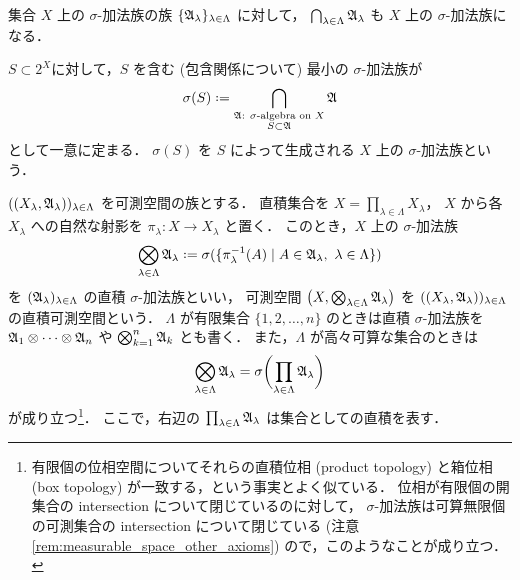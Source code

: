 \begin{example}
    集合 $X$ 上の $\sigma$-加法族の族 $\{\mathfrak{A}_\lambda\}_{\lambda\in\Lambda}$ に対して，
        $\bigcap_{\lambda\in\Lambda}\mathfrak{A}_\lambda$
    も $X$ 上の $\sigma$-加法族になる．

    $S\subset 2^X$に対して，$S$ を含む (包含関係について) 最小の $\sigma$-加法族が
    \begin{align*}
        \sigma(S)\defeq\bigcap_{\substack{\text{$\Afrak$: $\sigma$-algebra on $X$}\\S\subset\Afrak}}\Afrak
    \end{align*}
    として一意に定まる．
    $\sigma(S)$ を $S$ によって生成される $X$ 上の $\sigma$-加法族という．
\end{example}

\begin{example}\label{ex:product_sigma_algebra}
    $((X_\lambda,\mathfrak{A}_\lambda))_{\lambda\in\Lambda}$ を可測空間の族とする．
    直積集合を $X=\prod_{\lambda\in\Lambda}X_\lambda$，
    $X$ から各 $X_\lambda$ への自然な射影を $\pi_\lambda:X\to X_\lambda$ と置く．
    このとき，$X$ 上の $\sigma$-加法族
    \begin{align*}
        \bigotimes_{\lambda\in\Lambda}\Afrak_\lambda
        \defeq\sigma(\{\pi_\lambda^{-1}(A)\mid A\in\Afrak_\lambda,\ \lambda\in\Lambda\})
    \end{align*}
    を $(\mathfrak{A}_\lambda)_{\lambda\in\Lambda}$ の直積 $\sigma$-加法族といい，
    可測空間 $\left(X,\bigotimes_{\lambda\in\Lambda}\mathfrak{A}_\lambda\right)$ を
    $((X_\lambda,\mathfrak{A}_\lambda))_{\lambda\in\Lambda}$ の直積可測空間という．
    $\Lambda$ が有限集合 $\{1,2,\ldots,n\}$ のときは直積 $\sigma$-加法族を
    $\mathfrak{A}_1\otimes\cdots\otimes\mathfrak{A}_n$ や $\bigotimes_{k=1}^n\mathfrak{A}_k$ とも書く．
    また，$\Lambda$ が高々可算な集合のときは
    \begin{align*}
        \bigotimes_{\lambda\in\Lambda}\mathfrak{A}_\lambda
        =\sigma\biggl(\prod_{\lambda\in\Lambda}\mathfrak{A}_\lambda\biggr)
    \end{align*}
    が成り立つ\footnote{
        有限個の位相空間についてそれらの直積位相 (product topology) と箱位相 (box topology) が一致する，という事実とよく似ている．
        位相が有限個の開集合の intersection について閉じているのに対して，
        $\sigma$-加法族は可算無限個の可測集合の intersection について閉じている (注意 \ref{rem:measurable_space_other_axioms})
        ので，このようなことが成り立つ．
    }．
    ここで，右辺の $\prod_{\lambda\in\Lambda}\mathfrak{A}_\lambda$ は集合としての直積を表す．
\end{example}

